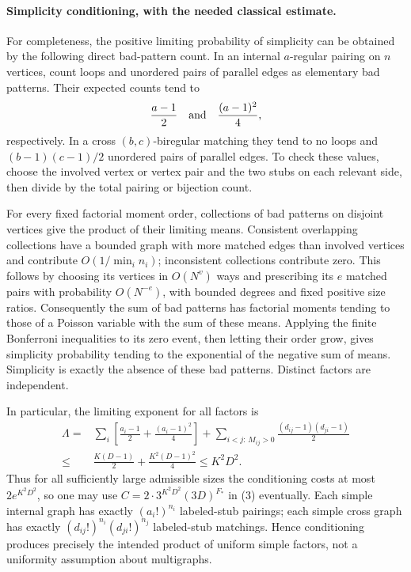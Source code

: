 \documentclass[11pt]{article}
\begin{document}
\paragraph{Simplicity conditioning, with the needed classical estimate.}
For completeness, the positive limiting probability of simplicity can be
obtained by the following direct bad-pattern count. In an internal
$a$-regular pairing on $n$ vertices, count loops and unordered pairs of
parallel edges as elementary bad patterns. Their expected counts tend to
\[
 \frac{a-1}{2}\quad\hbox{and}\quad\frac{(a-1)^2}{4},
\]
respectively. In a cross $(b,c)$-biregular matching they tend to no loops
and $(b-1)(c-1)/2$ unordered pairs of parallel edges. To check these
values, choose the involved vertex or vertex pair and the two stubs on
each relevant side, then divide by the total pairing or bijection count.

For every fixed factorial moment order, collections of bad patterns on
disjoint vertices give the product of their limiting means. Consistent
overlapping collections have a bounded graph with more matched edges
than involved vertices and contribute $O(1/\min_i n_i)$; inconsistent
collections contribute zero. This follows by choosing its vertices in
$O(N^v)$ ways and prescribing its $e$ matched pairs with probability
$O(N^{-e})$, with bounded degrees and fixed positive size ratios.
Consequently the sum of bad patterns has factorial moments tending to
those of a Poisson variable with the sum of these means. Applying the
finite Bonferroni inequalities to its zero event, then letting their
order grow, gives simplicity probability tending to the exponential
of the negative sum of means. Simplicity is exactly the absence of
these bad patterns. Distinct factors are independent.

In particular, the limiting exponent for all factors is
\begin{align*}
 \Lambda={}&\sum_i\left[\frac{a_i-1}{2}+\frac{(a_i-1)^2}{4}\right]
  +\sum_{i<j:\,M_{ij}>0}\frac{(d_{ij}-1)(d_{ji}-1)}{2}\\
 \leq{}&\frac{K(D-1)}2+\frac{K^2(D-1)^2}{4}\leq K^2D^2.
\end{align*}
Thus for all sufficiently large admissible sizes the conditioning costs
at most $2e^{K^2D^2}$, so one may use
$C=2\cdot3^{K^2D^2}(3D)^{F_*}$ in (3) eventually. Each simple internal
graph has exactly $(a_i!)^{n_i}$ labeled-stub pairings; each simple cross
graph has exactly $(d_{ij}!)^{n_i}(d_{ji}!)^{n_j}$ labeled-stub
matchings. Hence conditioning produces precisely the intended product
of uniform simple factors, not a uniformity assumption about multigraphs.
\end{document}
